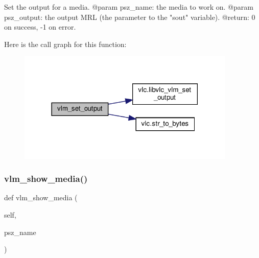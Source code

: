 \begin{DoxyVerb}Set the output for a media.
@param psz_name: the media to work on.
@param psz_output: the output MRL (the parameter to the "sout" variable).
@return: 0 on success, -1 on error.
\end{DoxyVerb}
 Here is the call graph for this function\+:
\nopagebreak
\begin{figure}[H]
\begin{center}
\leavevmode
\includegraphics[width=294pt]{classvlc_1_1_instance_ab791d7f564fbc01a818279368454a39c_cgraph}
\end{center}
\end{figure}
\mbox{\label{classvlc_1_1_instance_a49b576ac1b1d7db57ebaf616d02cc7dc}} 
\subsubsection{\texorpdfstring{vlm\+\_\+show\+\_\+media()}{vlm\_show\_media()}}
{\footnotesize\ttfamily def vlm\+\_\+show\+\_\+media (\begin{DoxyParamCaption}\item[{}]{self,  }\item[{}]{psz\+\_\+name }\end{DoxyParamCaption})}

